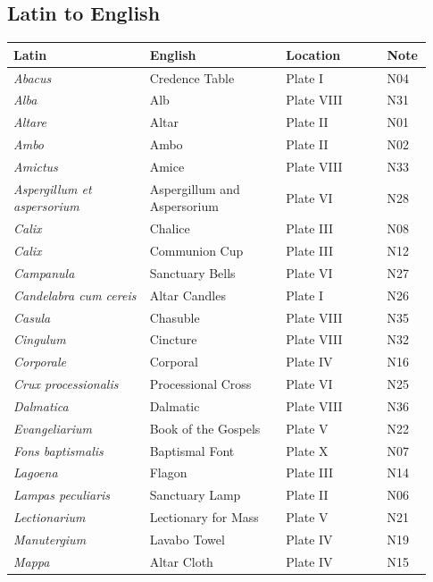 \subsection*{Latin to English}
{\footnotesize\begin{longtable}{>{\raggedright\arraybackslash}p{0.31\linewidth}>{\raggedright\arraybackslash}p{0.31\linewidth}>{\raggedright\arraybackslash}p{0.23\linewidth}>{\raggedright\arraybackslash}p{0.08\linewidth}}
\toprule
\textbf{Latin} & \textbf{English} & \textbf{Location} & \textbf{Note} \\
\midrule
\endhead
\textit{Abacus} & Credence Table & Plate I & N04 \\
\textit{Alba} & Alb & Plate VIII & N31 \\
\textit{Altare} & Altar & Plate II & N01 \\
\textit{Ambo} & Ambo & Plate II & N02 \\
\textit{Amictus} & Amice & Plate VIII & N33 \\
\textit{Aspergillum et aspersorium} & Aspergillum and Aspersorium & Plate VI & N28 \\
\textit{Calix} & Chalice & Plate III & N08 \\
\textit{Calix} & Communion Cup & Plate III & N12 \\
\textit{Campanula} & Sanctuary Bells & Plate VI & N27 \\
\textit{Candelabra cum cereis} & Altar Candles & Plate I & N26 \\
\textit{Casula} & Chasuble & Plate VIII & N35 \\
\textit{Cingulum} & Cincture & Plate VIII & N32 \\
\textit{Corporale} & Corporal & Plate IV & N16 \\
\textit{Crux processionalis} & Processional Cross & Plate VI & N25 \\
\textit{Dalmatica} & Dalmatic & Plate VIII & N36 \\
\textit{Evangeliarium} & Book of the Gospels & Plate V & N22 \\
\textit{Fons baptismalis} & Baptismal Font & Plate X & N07 \\
\textit{Lagoena} & Flagon & Plate III & N14 \\
\textit{Lampas peculiaris} & Sanctuary Lamp & Plate II & N06 \\
\textit{Lectionarium} & Lectionary for Mass & Plate V & N21 \\
\textit{Manutergium} & Lavabo Towel & Plate IV & N19 \\
\textit{Mappa} & Altar Cloth & Plate IV & N15 \\

\end{longtable}}

